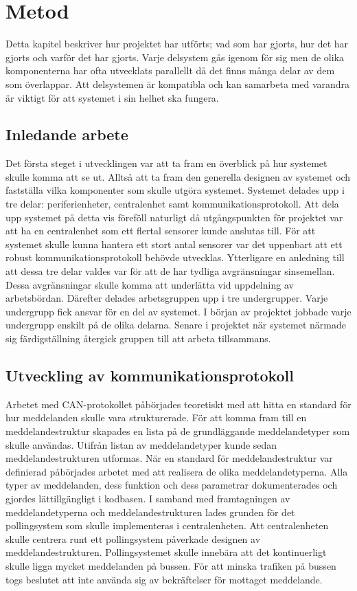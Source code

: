 \documentclass[a4paper]{article}
\begin{document}
\newpage

\section{Metod}
Detta kapitel beskriver hur projektet har utförts; vad som har gjorts, hur det har gjorts och varför det har gjorts.
Varje delsystem gås igenom för sig men de olika komponenterna har ofta utvecklats parallellt då det finns många delar av dem som överlappar.
Att delsystemen är kompatibla och kan samarbeta med varandra är viktigt för att systemet i sin helhet ska fungera.

\subsection{Inledande arbete}

Det första steget i utvecklingen var att ta fram en överblick på hur systemet skulle komma att se ut.
Alltså att ta fram den generella designen av systemet och fastställa vilka komponenter som skulle utgöra systemet.
Systemet delades upp i tre delar:
periferienheter, centralenhet samt kommunikationsprotokoll.
Att dela upp systemet på detta vis föreföll naturligt då utgångspunkten för projektet var att ha en centralenhet som ett flertal sensorer kunde anslutas till.
För att systemet skulle kunna hantera ett stort antal sensorer var det uppenbart att ett robust kommunikationsprotokoll behövde utvecklas.
Ytterligare en anledning till att dessa tre delar valdes var för att de har tydliga avgränsningar sinsemellan.
Dessa avgränsningar skulle komma att underlätta vid uppdelning av arbetsbördan.
Därefter delades arbetsgruppen upp i tre undergrupper.
Varje undergrupp fick ansvar för en del av systemet.
I början av projektet jobbade varje undergrupp enskilt på de olika delarna.
Senare i projektet när systemet närmade sig färdigställning återgick gruppen till att arbeta tillsammans.

\subsection{Utveckling av kommunikationsprotokoll}
Arbetet med CAN-protokollet påbörjades teoretiskt med att hitta en standard för hur meddelanden skulle vara strukturerade.
För att komma fram till en meddelandestruktur skapades en lista på de grundläggande meddelandetyper som skulle användas.
Utifrån listan av meddelandetyper kunde sedan meddelandestrukturen utformas.
När en standard för meddelandestruktur var definierad påbörjades arbetet med att realisera de olika meddelandetyperna.
Alla typer av meddelanden, dess funktion och dess parametrar dokumenterades och gjordes lättillgängligt i kodbasen.
I samband med framtagningen av meddelandetyperna och meddelandestrukturen lades grunden för det pollingsystem som skulle implementeras i centralenheten.
Att centralenheten skulle centrera runt ett pollingsystem påverkade designen av meddelandestrukturen.
Pollingsystemet skulle innebära att det kontinuerligt skulle ligga mycket meddelanden på bussen.
För att minska trafiken på bussen togs beslutet att inte använda sig av bekräftelser för mottaget meddelande.
\end{document}
